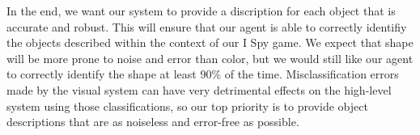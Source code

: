 \documentclass[11pt]{article}
\begin{document}
In the end, we want our system to provide a discription for each object that is accurate and robust. This will ensure that our agent is able to correctly identifiy the objects described within the context of our I Spy game. We expect that shape will be more prone to noise and error than color, but we would still like our agent to correctly identify the shape at least 90\% of the time. Misclassification errors made by the visual system can have very detrimental effects on the high-level system using those classifications, so our top priority is to provide object descriptions that are as noiseless and error-free as possible.



\end{document}
